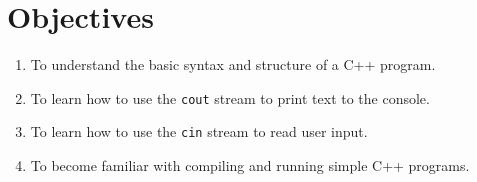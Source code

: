 \section{Objectives}
\begin{enumerate}
    \item To understand the basic syntax and structure of a C++ program.
    \item To learn how to use the \texttt{cout} stream to print text to the console.
    \item To learn how to use the \texttt{cin} stream to read user input.
    \item To become familiar with compiling and running simple C++ programs.
\end{enumerate}
